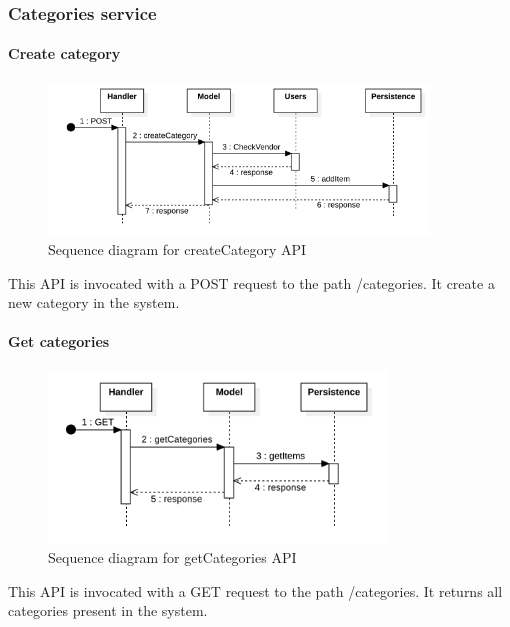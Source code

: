 \subsubsection{Categories service}
\paragraph*{Create category}
\begin{figure}[H]
    \includegraphics[width=0.9\textwidth]{res/images/sequence-diagrams/categories/createCategory.png}
    \caption{Sequence diagram for createCategory API}
\end{figure}
This API is invocated with a POST request to the path /categories. It create a new category in the system.

\paragraph*{Get categories}
\begin{figure}[H]
    \includegraphics[width=0.8\textwidth]{res/images/sequence-diagrams/categories/getCategories.png}
    \caption{Sequence diagram for getCategories API}
\end{figure}
This API is invocated with a GET request to the path /categories. It returns all categories present in the system.

